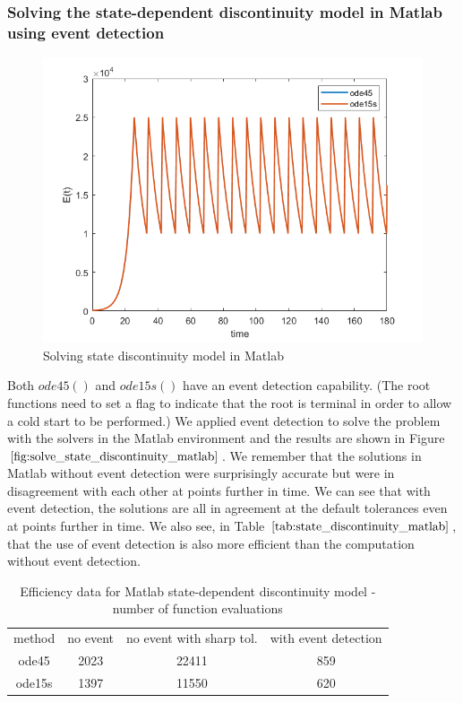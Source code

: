 \subsubsection{Solving the state-dependent discontinuity model in Matlab using event detection}
\begin{figure}[H]
\centering
\includegraphics[width=0.7\linewidth]{./figures/solve_state_discontinuity_matlab}
\caption{Solving state discontinuity model in Matlab}
\label{fig:solve_state_discontinuity_matlab}
\end{figure}
Both $ode45()$ and $ode15s()$ have an event detection capability. (The root functions need to set a flag to indicate that the root is terminal in order to allow a cold start to be performed.) We applied event detection to solve the problem with the solvers in the Matlab environment and the results are shown in Figure $\ref{fig:solve_state_discontinuity_matlab}$. We remember that the solutions in Matlab without event detection were surprisingly accurate but were in disagreement with each other at points further in time. We can see that with event detection, the solutions are all in agreement at the default tolerances even at points further in time. We also see, in Table $\ref{tab:state_discontinuity_matlab}$, that the use of event detection is also more efficient than the computation without event detection.

\begin{table}[h]
\caption {Efficiency data for Matlab state-dependent discontinuity model - number of function evaluations} \label{tab:state_discontinuity_matlab}
\begin{center}
\begin{tabular}{ c c c c } 
method & no event & no event with sharp tol. & with event detection \\ 
ode45 & 2023 & 22411 & 859 \\
ode15s & 1397 & 11550 & 620 \\
\end{tabular}
\end{center}
\end{table}

